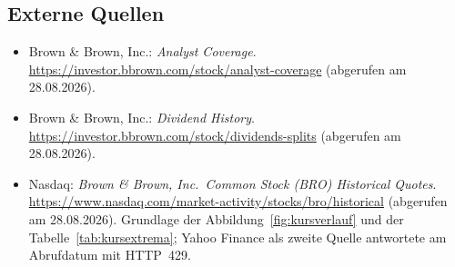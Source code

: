\subsection*{Externe Quellen}

\begin{itemize}
\item \label{quelle:analysten} Brown \& Brown, Inc.: \emph{Analyst
Coverage}. \url{https://investor.bbrown.com/stock/analyst-coverage}
(abgerufen am 28.08.2026).
\item \label{quelle:dividende} Brown \& Brown, Inc.: \emph{Dividend
History}. \url{https://investor.bbrown.com/stock/dividends-splits}
(abgerufen am 28.08.2026).
\item \label{quelle:kurse} Nasdaq: \emph{Brown \& Brown, Inc.\ Common Stock
(BRO) Historical Quotes}.
\url{https://www.nasdaq.com/market-activity/stocks/bro/historical}
(abgerufen am 28.08.2026). Grundlage der Abbildung~\ref{fig:kursverlauf}
und der Tabelle~\ref{tab:kursextrema}; Yahoo Finance als zweite Quelle
antwortete am Abrufdatum mit HTTP~429.
\end{itemize}

